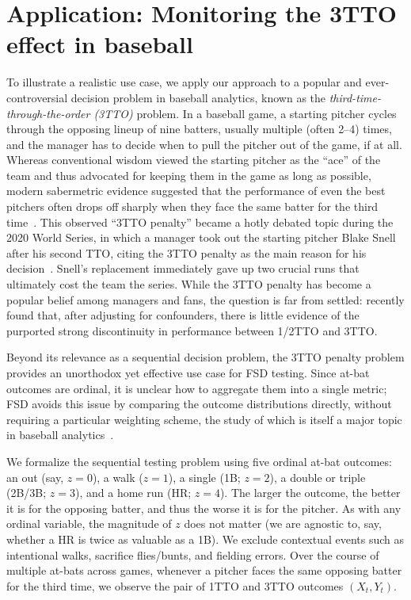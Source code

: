 \documentclass[12pt,twoside]{article}
\theoremstyle{plain}
\theoremstyle{definition}
\theoremstyle{remark}
\begin{document}
\section{Application: Monitoring the 3TTO effect in baseball}\label{sec:real_data_exp}

To illustrate a realistic use case, we apply our approach to a popular and ever-controversial decision problem in baseball analytics, known as the \emph{third-time-through-the-order (3TTO)} problem. 
In a baseball game, a starting pitcher cycles through the opposing lineup of nine batters, usually multiple (often 2--4) times, and the manager has to decide when to pull the pitcher out of the game, if at all. 
Whereas conventional wisdom viewed the starting pitcher as the ``ace'' of the team and thus advocated for keeping them in the game as long as possible, modern sabermetric evidence suggested that the performance of even the best pitchers often drops off sharply when they face the same batter for the third time~\citep{tango2007book}. 
This observed ``3TTO penalty'' became a hotly debated topic during the 2020 World Series, in which a manager took out the starting pitcher Blake Snell after his second TTO, citing the 3TTO penalty as the main reason for his decision~\citep{3TTO}. 
Snell's replacement immediately gave up two crucial runs that ultimately cost the team the series.
While the 3TTO penalty has become a popular belief among managers and fans, the question is far from settled: \citet{brill2023ttop} recently found that, after adjusting for confounders, there is little evidence of the purported strong discontinuity in performance between 1/2TTO and 3TTO. 

Beyond its relevance as a sequential decision problem, the 3TTO penalty problem provides an unorthodox yet effective use case for FSD testing. 
Since at-bat outcomes are ordinal, it is unclear how to aggregate them into a single metric; FSD avoids this issue by comparing the outcome distributions directly, without requiring a particular weighting scheme, the study of which is itself a major topic in baseball analytics~\citep[e.g.,][]{tango2007book}.

We formalize the sequential testing problem using five ordinal at-bat outcomes: an out (say, $z=0$), a walk ($z=1$), a single (1B; $z=2$), a double or triple (2B/3B; $z=3$), and a home run (HR; $z=4$). 
The larger the outcome, the better it is for the opposing batter, and thus the worse it is for the pitcher. 
As with any ordinal variable, the magnitude of $z$ does not matter (we are agnostic to, say, whether a HR is twice as valuable as a 1B). 
We exclude contextual events such as intentional walks, sacrifice flies/bunts, and fielding errors. 
Over the course of multiple at-bats across games, whenever a pitcher faces the same opposing batter for the third time, we observe the pair of 1TTO and 3TTO outcomes $(X_t, Y_t)$. 
\end{document}
